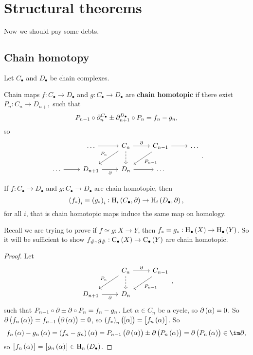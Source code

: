 \pagebreak

\section{Structural theorems}

Now we should pay some debts.

\subsection{Chain homotopy}

Let $ C_\bullet $ and $ D_\bullet $ be chain complexes.

\begin{definition*}
Chain maps $ f : C_\bullet \to D_\bullet $ and $ g : C_\bullet \to D_\bullet $ are \textbf{chain homotopic} if there exist $ P_n : C_n \to D_{n + 1} $ such that
$$ P_{n - 1} \circ \partial_n^{C_\bullet} \pm \partial_{n + 1}^{D_\bullet} \circ P_n = f_n - g_n, $$
so
$$
\begin{tikzcd}
& \dots \arrow{r} & C_n \arrow{r}{\da} \arrow{dl}[swap]{P_n} \arrow[dashed]{d} & C_{n - 1} \arrow{r} \arrow{dl}{P_{n - 1}} & \dots \\
\dots \arrow{r} & D_{n + 1} \arrow{r}[swap]{\da} & D_n \arrow{r} & \dots &
\end{tikzcd}.
$$
\end{definition*}

\begin{lemma}
If $ f : C_\bullet \to D_\bullet $ and $ g : C_\bullet \to D_\bullet $ are chain homotopic, then
$$ \br{f_*}_i = \br{g_*}_i : \H_i\br{C_\bullet, \da} \to \H_i\br{D_\bullet, \da}, $$
for all $ i $, that is chain homotopic maps induce the same map on homology.
\end{lemma}

Recall we are trying to prove if $ f \simeq g : X \to Y $, then $ f_* = g_* : \H_\bullet\br{X} \to \H_\bullet\br{Y} $. So it will be sufficient to show $ f_\#, g_\# : \C_\bullet\br{X} \to \C_\bullet\br{Y} $ are chain homotopic.

\begin{proof}
Let
$$
\begin{tikzcd}
& C_n \arrow{r}{\da} \arrow{dl}[swap]{P_n} \arrow[dashed]{d} & C_{n - 1} \arrow{dl}{P_{n - 1}} \\
D_{n + 1} \arrow{r}[swap]{\da} & D_n &
\end{tikzcd},
$$
such that $ P_{n - 1} \circ \partial \pm \partial \circ P_n = f_n - g_n $. Let $ \alpha \in C_n $ be a cycle, so $ \da\br{\alpha} = 0 $. So $ \da\br{f_n\br{\alpha}} = f_{n - 1}\br{\da\br{\alpha}} = 0 $, so $ \br{f_*}_n\br{\sbr{\alpha}} = \sbr{f_n\br{\alpha}} $. So
$$ f_n\br{\alpha} - g_n\br{\alpha} = \br{f_n - g_n}\br{\alpha} = P_{n - 1}\br{\da\br{\alpha}} \pm \da\br{P_n\br{\alpha}} = \da\br{P_n\br{\alpha}} \in \im \da, $$
so $ \sbr{f_n\br{\alpha}} = \sbr{g_n\br{\alpha}} \in \H_n\br{D_\bullet} $.
\end{proof}

